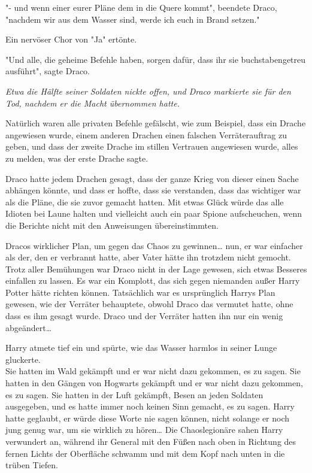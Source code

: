 {"- und wenn einer eurer Pläne dem in die Quere kommt", beendete Draco, "nachdem wir aus dem Wasser sind, werde ich euch in Brand setzen."

Ein nervöser Chor von "Ja" ertönte.

"Und alle, die geheime Befehle haben, sorgen dafür, dass ihr sie buchstabengetreu ausführt", sagte Draco.

\emph{Etwa die Hälfte seiner Soldaten nickte offen, und Draco markierte sie für den Tod, nachdem er die Macht übernommen hatte.}

Natürlich waren alle privaten Befehle gefälscht, wie zum Beispiel, dass ein Drache angewiesen wurde, einem anderen Drachen einen falschen Verräterauftrag zu geben, und dass der zweite Drache im stillen Vertrauen angewiesen wurde, alles zu melden, was der erste Drache sagte.

Draco hatte jedem Drachen gesagt, dass der ganze Krieg von dieser einen Sache abhängen könnte, und dass er hoffte, dass sie verstanden, dass das wichtiger war als die Pläne, die sie zuvor gemacht hatten. Mit etwas Glück würde das alle Idioten bei Laune halten und vielleicht auch ein paar Spione aufscheuchen, wenn die Berichte nicht mit den Anweisungen übereinstimmten.

Dracos wirklicher Plan, um gegen das Chaos zu gewinnen… nun, er war einfacher als der, den er verbrannt hatte, aber Vater hätte ihn trotzdem nicht gemocht.\\ Trotz aller Bemühungen war Draco nicht in der Lage gewesen, sich etwas Besseres einfallen zu lassen. Es war ein Komplott, das sich gegen niemanden außer Harry Potter hätte richten können. Tatsächlich war es ursprünglich Harrys Plan gewesen, wie der Verräter behauptete, obwohl Draco das vermutet hatte, ohne dass es ihm gesagt wurde. Draco und der Verräter hatten ihn nur ein wenig abgeändert…

Harry atmete tief ein und spürte, wie das Wasser harmlos in seiner Lunge gluckerte.\\ Sie hatten im Wald gekämpft und er war nicht dazu gekommen, es zu sagen. Sie hatten in den Gängen von Hogwarts gekämpft und er war nicht dazu gekommen, es zu sagen. Sie hatten in der Luft gekämpft, Besen an jeden Soldaten ausgegeben, und es hatte immer noch keinen Sinn gemacht, es zu sagen. Harry hatte geglaubt, er würde diese Worte nie sagen können, nicht solange er noch jung genug war, um sie wirklich zu hören… Die Chaoslegionäre sahen Harry verwundert an, während ihr General mit den Füßen nach oben in Richtung des fernen Lichts der Oberfläche schwamm und mit dem Kopf nach unten in die trüben Tiefen.

}
